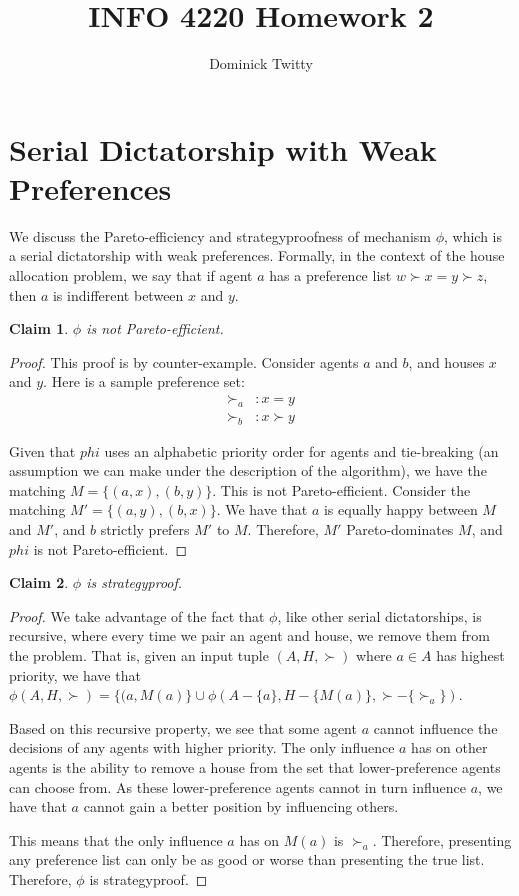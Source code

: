 \documentclass[12pt]{article}
\newtheorem{claim}{Claim}
\begin{document}
\title{INFO 4220 Homework 2}
\author{Dominick Twitty}
\date{}
\maketitle

\section{Serial Dictatorship with Weak Preferences}
We discuss the Pareto-efficiency and strategyproofness of mechanism $\phi$, which is a serial dictatorship with weak preferences. Formally, in the context of the house allocation problem, we say that if agent $a$ has a preference list $w \succ x = y \succ z$, then $a$ is indifferent between $x$ and $y$.
\begin{claim}
$\phi$ is not Pareto-efficient.
\end{claim}
\begin{proof}
This proof is by counter-example. Consider agents $a$ and $b$, and houses $x$ and $y$. Here is a sample preference set:
\begin{align*}
\succ_a &: x = y\\
\succ_b &: x \succ y
\end{align*}

Given that $phi$ uses an alphabetic priority order for agents and tie-breaking (an assumption we can make under the description of the algorithm), we have the matching $M = \{(a, x), (b, y)\}$. This is not Pareto-efficient. Consider the matching $M' = \{(a, y), (b, x)\}$. We have that $a$ is equally happy between $M$ and $M'$, and $b$ strictly prefers $M'$ to $M$. Therefore, $M'$ Pareto-dominates $M$, and $phi$ is not Pareto-efficient.
\end{proof}

\begin{claim}
$\phi$ is strategyproof.
\end{claim}
\begin{proof} 
We take advantage of the fact that $\phi$, like other serial dictatorships, is recursive, where every time we pair an agent and house, we remove them from the problem. That is, given an input tuple $(A, H, \succ)$ where $a \in A$ has highest priority, we have that $\phi(A, H, \succ) = \{(a, M(a)\} \cup \phi(A - \{a\}, H - \{M(a)\}, \succ - \{\succ_a\})$. 

Based on this recursive property, we see that some agent $a$ cannot influence the decisions of any agents with higher priority. The only influence $a$ has on other agents is the ability to remove a house from the set that lower-preference agents can choose from. As these lower-preference agents cannot in turn influence $a$, we have that $a$ cannot gain a better position by influencing others. 

This means that the only influence $a$ has on $M(a)$ is $\succ_a$. Therefore, presenting any preference list can only be as good or worse than presenting the true list. Therefore, $\phi$ is strategyproof.
\end{proof}
\end{document}
